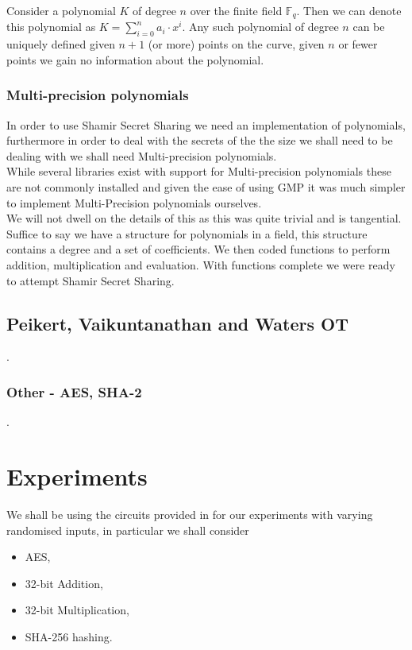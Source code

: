\documentclass[ %
                    author={Nicholas Tutte},
                supervisor={Prof. Nigel Smart},
                    degree={MEng},
                     title={Secure Two Party Computation},
                  subtitle={A practical comparison of recent protocols},
                      type={Research - GG1K},
                      year={2015} ]{dissertation}
\begin{document}
			Consider a polynomial $K$ of degree $n$ over the finite field $\mathbb{F}_q$. Then we can denote this polynomial as $K = \sum_{i=0}^{n} a_i \cdot x ^ i$. Any such polynomial of degree $n$ can be uniquely defined given $n+1$ (or more) points on the curve, given $n$ or fewer points we gain no information about the polynomial.

			\subsection{Multi-precision polynomials}
				In order to use Shamir Secret Sharing we need an implementation of polynomials, furthermore in order to deal with the secrets of the the size we shall need to be dealing with we shall need Multi-precision polynomials.\\
				
				While several libraries exist with support for Multi-precision polynomials these are not commonly installed and given the ease of using GMP it was much simpler to implement Multi-Precision polynomials ourselves.\\

				We will not dwell on the details of this as this was quite trivial and is tangential. Suffice to say we have a structure for polynomials in a field, this structure contains a degree and a set of coefficients. We then coded functions to perform addition, multiplication and evaluation. With functions complete we were ready to attempt Shamir Secret Sharing.
			

		\section{Peikert, Vaikuntanathan and Waters OT}

			.

		\subsection{Other - AES, SHA-2}

			.


	\chapter{Experiments} \label{sec:Results}
		We shall be using the circuits provided in \cite{NigelCircuits} for our experiments with varying randomised inputs, in particular we shall consider
		
		\begin{itemize}
			\item AES,
			\item 32-bit Addition,
			\item 32-bit Multiplication,
			\item SHA-256 hashing.
		\end{itemize}
\end{document}
